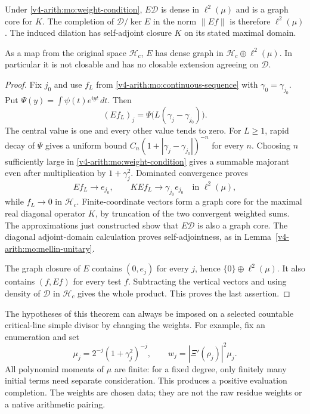 \begin{theorem}
\label{v4-arith:mo:countable-completion}
Under \eqref{v4-arith:mo:weight-condition}, $E\mathscr D$ is dense in
$\ell^2(\mu)$ and is a graph core for $K$.
The completion of $\mathscr D/\ker E$ in the norm $\|Ef\|$
is therefore $\ell^2(\mu)$. The induced dilation has self-adjoint
closure $K$ on its stated maximal domain.

As a map from the original space $\mathscr H_c$, $E$ has dense
graph in $\mathscr H_c\oplus\ell^2(\mu)$. In particular it is
not closable and has no closable extension agreeing on
$\mathscr D$.
\end{theorem}
\begin{proof}
Fix $j_0$ and use $f_L$ from \eqref{v4-arith:mo:continuous-sequence} with
$\gamma_0=\gamma_{j_0}$. Put
$\Psi(y)=\int\psi(t)e^{iyt}\,dt$. Then
\[
 (Ef_L)_j=\Psi\bigl(L(\gamma_j-\gamma_{j_0})\bigr).
\]
The central value is one and every other value tends to zero.
For $L\geq1$, rapid decay of $\Psi$ gives a uniform bound
$C_n(1+|\gamma_j-\gamma_{j_0}|)^{-n}$ for every $n$.
Choosing $n$ sufficiently large in
\eqref{v4-arith:mo:weight-condition} gives a summable majorant even after
multiplication by $1+\gamma_j^2$. Dominated convergence proves
\[
 Ef_L\longrightarrow e_{j_0},\qquad
 KEf_L\longrightarrow\gamma_{j_0}e_{j_0}
 \quad\text{in }\ell^2(\mu),
\]
while $f_L\to0$ in $\mathscr H_c$.
Finite-coordinate vectors form a graph core for the maximal
real diagonal operator $K$, by truncation of the two convergent
weighted sums. The approximations just constructed show that
$E\mathscr D$ is also a graph core. The diagonal adjoint-domain
calculation proves self-adjointness, as in
Lemma~\ref{v4-arith:mo:mellin-unitary}.

The graph closure of $E$ contains $(0,e_j)$ for every $j$, hence
$\{0\}\oplus\ell^2(\mu)$. It also contains $(f,Ef)$ for every
test $f$. Subtracting the vertical vectors and using density of
$\mathscr D$ in $\mathscr H_c$ gives the whole product. This
proves the last assertion.
\end{proof}

The hypotheses of this theorem can always be imposed on a selected
countable critical-line simple divisor by changing the weights.
For example, fix an enumeration and set
\[
 \mu_j=2^{-j}(1+\gamma_j^2)^{-j},\qquad
 w_j=|\Xi'(\rho_j)|^2\mu_j.
\]
All polynomial moments of $\mu$ are finite: for a fixed degree,
only finitely many initial terms need separate consideration.
This produces a positive evaluation completion. The weights
are chosen data; they are not the raw residue weights or a native
arithmetic pairing.

